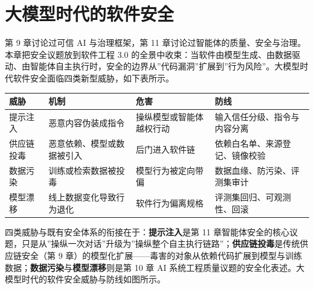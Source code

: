 \documentclass[12pt,a4paper,twoside,openany]{ctexbook}
\numberwithin{figure}{chapter}
\numberwithin{table}{chapter}
\newcounter{none}
\begin{document}
\section{大模型时代的软件安全}\label{ux5927ux6a21ux578bux65f6ux4ee3ux7684ux8f6fux4ef6ux5b89ux5168}

第 9 章讨论过可信 AI 与治理框架，第 11
章讨论过智能体的质量、安全与治理。本章把安全议题放到软件工程 3.0
的全景中收束：当软件由模型生成、由数据驱动、由智能体自主执行时，安全的边界从''代码漏洞''扩展到''行为风险''。大模型时代软件安全面临四类新型威胁，如下表所示。

{\def\LTcaptype{none} %
\begin{longtable}[]{@{}
  >{\raggedright\arraybackslash}p{}
  >{\raggedright\arraybackslash}p{}
  >{\raggedright\arraybackslash}p{}
  >{\raggedright\arraybackslash}p{}@{}}
\toprule\noalign{}
\begin{minipage}[b]{\linewidth}\raggedright
威胁
\end{minipage} & \begin{minipage}[b]{\linewidth}\raggedright
机制
\end{minipage} & \begin{minipage}[b]{\linewidth}\raggedright
危害
\end{minipage} & \begin{minipage}[b]{\linewidth}\raggedright
防线
\end{minipage} \\
\midrule\noalign{}
\endhead
\bottomrule\noalign{}
\endlastfoot
提示注入 & 恶意内容伪装成指令 & 操纵模型或智能体越权行动 &
输入信任分级、指令与内容分离 \\
供应链投毒 & 恶意依赖、模型或数据被引入 & 后门进入软件链 &
依赖白名单、来源登记、镜像校验 \\
数据污染 & 训练或检索数据被投毒 & 模型行为被定向带偏 &
数据血缘、防污染、评测集审计 \\
模型漂移 & 线上数据变化导致行为退化 & 软件行为偏离规格 &
评测集回归、可观测性、回滚 \\
\end{longtable}
}

四类威胁与既有安全体系的衔接在于：\textbf{提示注入}是第 11
章智能体安全的核心议题，只是从''操纵一次对话''升级为''操纵整个自主执行链路''；\textbf{供应链投毒}是传统供应链安全（第
9
章）的模型化扩展------毒害的对象从依赖代码扩展到模型与训练数据；\textbf{数据污染}与\textbf{模型漂移}则是第
10 章 AI
系统工程质量议题的安全化表述。大模型时代的软件安全威胁与防线如图所示。
\end{document}
